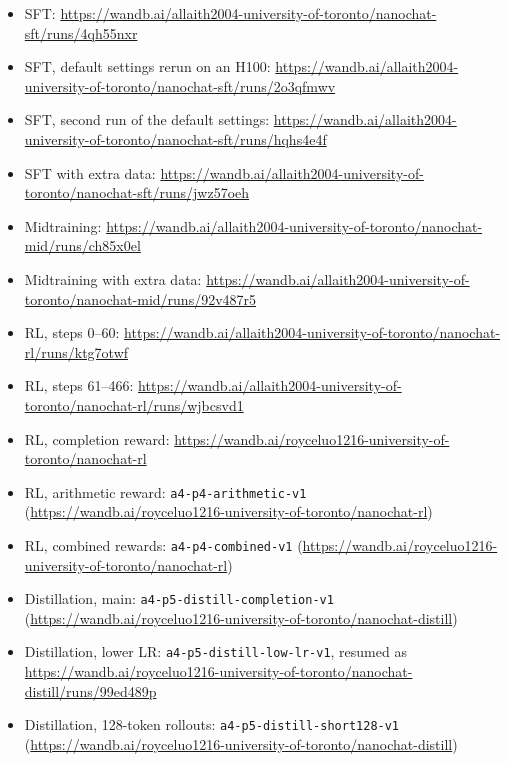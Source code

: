 \documentclass[10pt]{article}
\newcommand{\code}[1]{\texttt{#1}}
\begin{document}
\begin{itemize}\itemsep0pt\footnotesize
\item SFT: \url{https://wandb.ai/allaith2004-university-of-toronto/nanochat-sft/runs/4qh55nxr}
\item SFT, default settings rerun on an H100: \url{https://wandb.ai/allaith2004-university-of-toronto/nanochat-sft/runs/2o3qfmwv}
\item SFT, second run of the default settings: \url{https://wandb.ai/allaith2004-university-of-toronto/nanochat-sft/runs/hqhs4e4f}
\item SFT with extra data: \url{https://wandb.ai/allaith2004-university-of-toronto/nanochat-sft/runs/jwz57oeh}
\item Midtraining: \url{https://wandb.ai/allaith2004-university-of-toronto/nanochat-mid/runs/ch85x0el}
\item Midtraining with extra data: \url{https://wandb.ai/allaith2004-university-of-toronto/nanochat-mid/runs/92v487r5}
\item RL, steps 0--60: \url{https://wandb.ai/allaith2004-university-of-toronto/nanochat-rl/runs/ktg7otwf}
\item RL, steps 61--466: \url{https://wandb.ai/allaith2004-university-of-toronto/nanochat-rl/runs/wjbcsvd1}
\item RL, completion reward:
\url{https://wandb.ai/royceluo1216-university-of-toronto/nanochat-rl}

\item RL, arithmetic reward:
\code{a4-p4-arithmetic-v1}
(\url{https://wandb.ai/royceluo1216-university-of-toronto/nanochat-rl})

\item RL, combined rewards:
\code{a4-p4-combined-v1}
(\url{https://wandb.ai/royceluo1216-university-of-toronto/nanochat-rl})

\item Distillation, main:
\code{a4-p5-distill-completion-v1}
(\url{https://wandb.ai/royceluo1216-university-of-toronto/nanochat-distill})

\item Distillation, lower LR:
\code{a4-p5-distill-low-lr-v1},
resumed as
\url{https://wandb.ai/royceluo1216-university-of-toronto/nanochat-distill/runs/99ed489p}

\item Distillation, 128-token rollouts:
\code{a4-p5-distill-short128-v1}
(\url{https://wandb.ai/royceluo1216-university-of-toronto/nanochat-distill})
\end{itemize}
\end{document}
